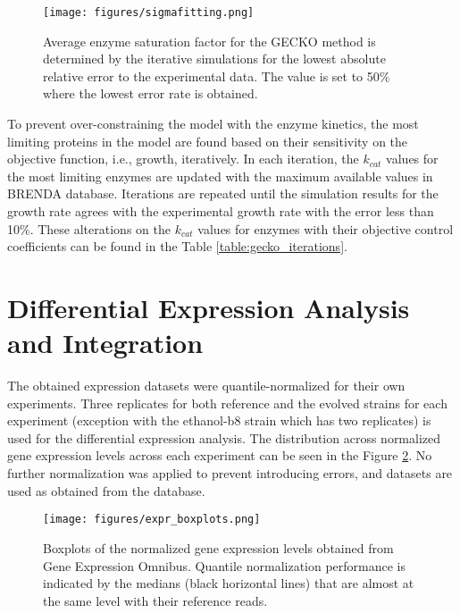 \begin{figure}[H]
  \begin{center}
    \texttt{[image: figures/sigmafitting.png]}
    \caption[Average enzyme saturation factor for the GECKO method is determined by the iterative simulations for the lowest absolute relative error to the experimental data]{Average enzyme saturation factor for the GECKO method is determined by the iterative simulations for the lowest absolute relative error to the experimental data. The value is set to 50\% where the lowest error rate is obtained.}
    \label{fig:sigma_fitting}
  \end{center}
\end{figure}

To prevent over-constraining the model with the enzyme kinetics, the most limiting proteins in the model are found based on their sensitivity on the objective function, i.e., growth, iteratively. In each iteration, the $k_{cat}$ values for the most limiting enzymes are updated with the maximum available values in BRENDA\cite{jeske2019brenda} database. Iterations are repeated until the simulation results for the growth rate agrees with the experimental growth rate with the error less than 10\%. These alterations on the $k_{cat}$ values for enzymes with their objective control coefficients can be found in the Table \ref{table:gecko_iterations}.



\section{Differential Expression Analysis and Integration}

The obtained expression datasets were quantile-normalized for their own experiments. Three replicates for both reference and the evolved strains for each experiment (exception with the ethanol-b8 strain which has two replicates) is used for the differential expression analysis. The distribution across normalized gene expression levels across each experiment can be seen in the Figure \ref{fig:expr_boxplot}. No further normalization was applied to prevent introducing errors, and datasets are used as obtained from the database.

\begin{figure}[H]
  \begin{center}
  \texttt{[image: figures/expr\_boxplots.png]}
  \caption[Boxplots of the normalized gene expression levels]{Boxplots of the normalized gene expression levels obtained from Gene Expression Omnibus. Quantile normalization performance is indicated by the medians (black horizontal lines) that are almost at the same level with their reference reads.}
  \label{fig:expr_boxplot}
  \end{center}
\end{figure}

